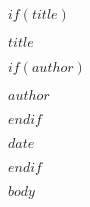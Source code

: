 \documentclass{memoir}
\begin{document}
$if(title)$
\thispagestyle{empty}
\vspace*{\fill}
\begin{center}
\Huge\textbf{$title$}
\end{center}
$if(author)$
\begin{center}
\LARGE{$author$}\\[0.5em] %
\end{center}
$endif$
\begin{center}
\normalsize{$date$} %
\end{center}
\vspace*{\fill}
\vspace*{\fill}
$endif$


$body$
\end{document}
